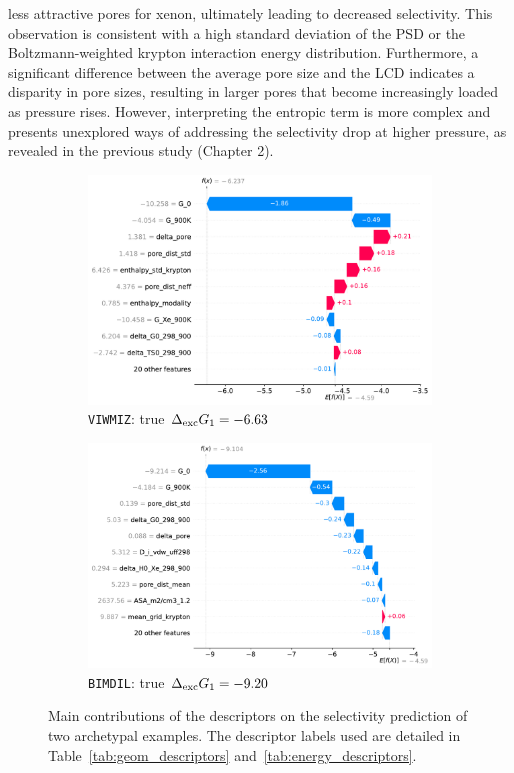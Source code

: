 \documentclass[main]{subfiles}
\begin{document}
less attractive pores for xenon, ultimately leading to decreased selectivity. This observation is consistent with a high standard deviation of the PSD or the Boltzmann-weighted krypton interaction energy distribution. Furthermore, a significant difference between the average pore size and the LCD indicates a disparity in pore sizes, resulting in larger pores that become increasingly loaded as pressure rises. However, interpreting the entropic term is more complex and presents unexplored ways of addressing the selectivity drop at higher pressure, as revealed in the previous study (Chapter 2).

\begin{figure}[ht]
    \centering
    \begin{subfigure}[b]{0.47\textwidth}
      \centering
      \includegraphics[width=\textwidth]{figures/4-ml/main/VIWMIZ_clean.pdf}
      \caption{\texttt{VIWMIZ}: true $\Delta_{\text{exc}} G_1=-6.63$}
    \end{subfigure}
         \hfill
    \begin{subfigure}[b]{0.47\textwidth}
      \centering
      \includegraphics[width=\textwidth]{figures/4-ml/main/BIMDIL_clean.pdf}
      \caption{\texttt{BIMDIL}: true $\Delta_{\text{exc}} G_1=-9.20$}
    \end{subfigure}
  \caption{Main contributions of the descriptors on the selectivity prediction of two archetypal examples. The descriptor labels used are detailed in Table~\ref{tab:geom_descriptors} and~\ref{tab:energy_descriptors}.}\label{fgr:contribution}
\end{figure}
\end{document}
